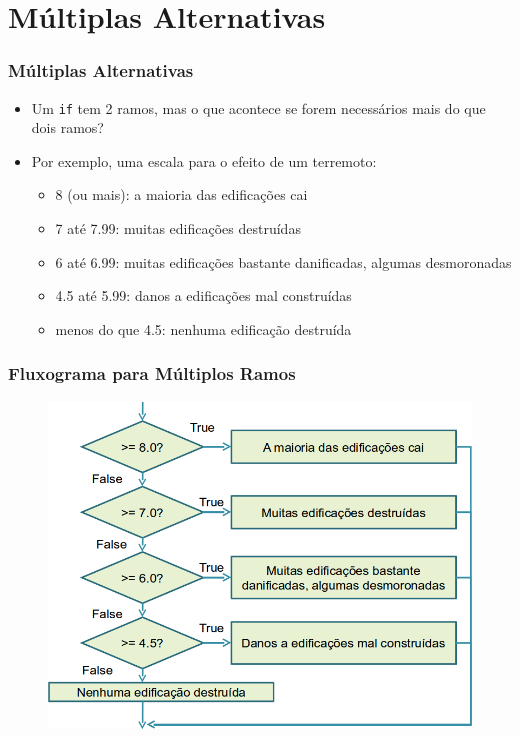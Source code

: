 \documentclass[xcolor={dvipsnames,table},aspectratio=169]{beamer}
\begin{document}
\section{Múltiplas Alternativas}

\begin{frame}\frametitle{Múltiplas Alternativas}
\begin{itemize}
	\item Um \texttt{if} tem 2 ramos, mas o que acontece se forem necessários mais do que dois ramos?
	\item Por exemplo, uma escala para o efeito de um terremoto:
	\begin{itemize}
		\item 8 (ou mais): a maioria das edificações cai
		\item 7 até 7.99: muitas edificações destruídas
		\item 6 até 6.99: muitas edificações bastante danificadas, algumas desmoronadas
		\item 4.5 até 5.99: danos a edificações mal construídas
		\item menos do que 4.5: nenhuma edificação destruída
	\end{itemize}
\end{itemize}
\end{frame}

\begin{frame}\frametitle{Fluxograma para Múltiplos Ramos}
\begin{figure}[h]
	\includegraphics[height=0.7\paperheight,center]{pucrs-ep-fprog-unidade_03-decisoes-laminas-fluxograma_multiplos_ramos.png}
\end{figure}
\end{frame}
\end{document}
